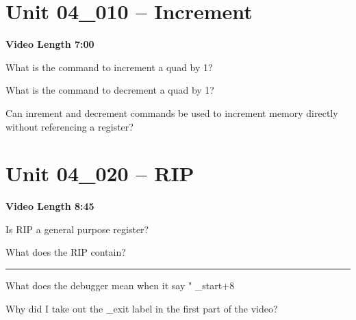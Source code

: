 \documentclass[letterpaper,12pt]{exam}
\newcommand{\unit}{Unit 04}
\begin{document}

\section*{\unit\_010 -- Increment}
\par{\selectfont\textbf{Video Length 7:00 }}
\begin{questions}

\begin{samepage}
    \question What is the command to increment a quad by 1?
    \vspace{5mm}
\end{samepage}

\begin{samepage}
    \question What is the command to decrement a quad by 1?
    \vspace{5mm}
\end{samepage}

\begin{samepage}
    \question Can inrement and decrement commands be used to increment memory directly without referencing a register?
    \vspace{5mm}
\end{samepage}
\par
 
\section*{\unit\_020 -- RIP}
\par{\selectfont\textbf{Video Length 8:45}}
\begin{samepage}
    \question Is RIP a general purpose register?
    \vspace{5mm}
\end{samepage}
\par
\begin{samepage}
    \question What does the RIP contain?
    \vspace{5mm}
\end{samepage}
\rule{0.5\textwidth}{.4pt} %
\begin{samepage}
    \question What does the debugger mean when it say " \_start+8
    \vspace{5mm}
\end{samepage}
\par
 \begin{samepage}
     \question Why did I take out the \_exit label in the first part of the video?
     \vspace{5mm}
 \end{samepage}
 \par
  

\end{questions}
\end{document}
